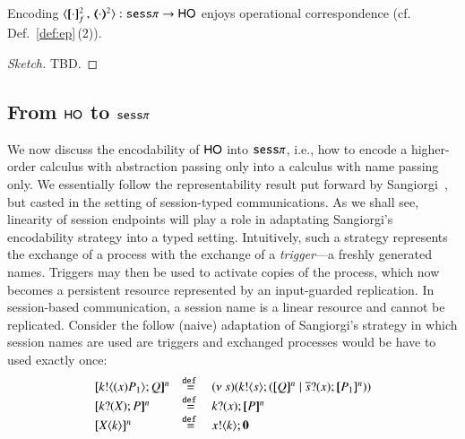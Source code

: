 \begin{proposition}
	Encoding $\fencod{\cdot}{\cdot}{2}{f}: \sesp \to \HO$ 
enjoys operational correspondence (cf. Def.~\ref{def:ep}\,(2)).
\end{proposition}

\begin{proof}[Sketch]
TBD.
\end{proof}

\subsection{From $\mathsf{HO}$ to $\mathtt{sess}\pi$}

We now discuss the encodability of  $\mathsf{HO}$ into $\mathtt{sess}\pi$, i.e., how to encode a higher-order calculus with abstraction passing only
into a calculus with name passing only. We essentially follow the representability result put forward by Sangiorgi~\cite{San92,SaWabook}, but casted in the setting of session-typed communications. As we shall see, linearity of session endpoints will play a role in adaptating Sangiorgi's encodability strategy into a typed setting. Intuitively, such a strategy represents the exchange of a process with the exchange of a \emph{trigger}---a freshly generated names. Triggers may then be used to activate copies of the process, which now becomes a persistent resource represented by an input-guarded replication. In session-based communication, a session name is a linear resource and cannot be replicated. Consider the follow (naive) adaptation of Sangiorgi's strategy in which session names are used are triggers and exchanged processes would be have to used exactly once:
\[
	\begin{array}{lcl}
		\pmap{\bout{k}{\abs{x} P_1} Q}{n} & \defeq &  \newsp{s}{\bout{k}{s} (\pmap{Q}{n} \Par \binp{\dual{s}}{x} \pmap{P_1}{n})} \\
		\pmap{\binp{k}{X} P}{n} & \defeq& \binp{k}{x} \pmap{P}{n}\\
		\pmap{\appl{X}{k}}{n} & \defeq & \bout{x}{k} \inact
	\end{array}
	\]
%
%
